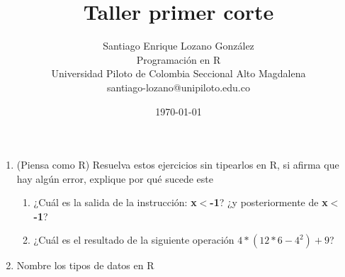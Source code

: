\documentclass[12pt]{article} %
\title{Taller primer corte}
\author{Santiago Enrique Lozano González \\
	Programación en R \\
	Universidad Piloto de Colombia Seccional Alto Magdalena  \\
	santiago-lozano@unipiloto.edu.co \\
	}
\date{\today}
\begin{document}
\maketitle
\begin{enumerate}
\item (Piensa como R) Resuelva estos ejercicios sin tipearlos en R, si afirma que hay algún error, explique por qué sucede este
\begin{enumerate}
\item ¿Cuál es la salida de la instrucción: \textbf{x$<$-1}? ¿y posteriormente de \textbf{x$<$ -1}?
\item ¿Cuál es el resultado de la siguiente operación $4*(12*6-4^2)+9$?
\end{enumerate}
\item Nombre los tipos de datos en R
\end{enumerate}
\end{document}
